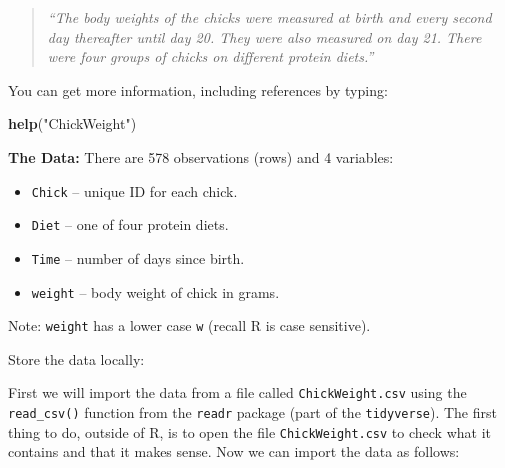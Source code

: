 \documentclass[]{book}
\newenvironment{Shaded}{\begin{snugshade}}{\end{snugshade}}
\newcommand{\KeywordTok}[1]{\textcolor[rgb]{0.13,0.29,0.53}{\textbf{#1}}}
\newcommand{\NormalTok}[1]{#1}
\newcommand{\OperatorTok}[1]{\textcolor[rgb]{0.81,0.36,0.00}{\textbf{#1}}}
\newcommand{\StringTok}[1]{\textcolor[rgb]{0.31,0.60,0.02}{#1}}
\providecommand{\tightlist}{%
  \setlength{\itemsep}{0pt}\setlength{\parskip}{0pt}}
\theoremstyle{definition}
\theoremstyle{definition}
\theoremstyle{definition}
\theoremstyle{remark}
\begin{document}
\begin{quote}
\emph{``The body weights of the chicks were measured at birth and every second day thereafter
until day 20. They were also measured on day 21. There were four groups of chicks on
different protein diets.''}
\end{quote}

You can get more information, including references by typing:

\begin{Shaded}
\begin{Highlighting}[]
\KeywordTok{help}\NormalTok{(}\StringTok{"ChickWeight"}\NormalTok{)}
\end{Highlighting}
\end{Shaded}

\textbf{The Data: }
There are 578 observations (rows) and 4 variables:

\begin{itemize}
\tightlist
\item
  \texttt{Chick} -- unique ID for each chick.
\item
  \texttt{Diet} -- one of four protein diets.
\item
  \texttt{Time} -- number of days since birth.
\item
  \texttt{weight} -- body weight of chick in grams.
\end{itemize}

Note: \texttt{weight} has a lower case \texttt{w} (recall R is case sensitive).

Store the data locally:

\begin{Shaded}
\end{Shaded}

First we will import the data from a file called \texttt{ChickWeight.csv} using the \texttt{read\_csv()}
function from the \texttt{readr} package (part of the \texttt{tidyverse}). The first thing to do,
outside of R, is to open the file \texttt{ChickWeight.csv} to check what it contains and that
it makes sense. Now we can import the data as follows:
\end{document}
